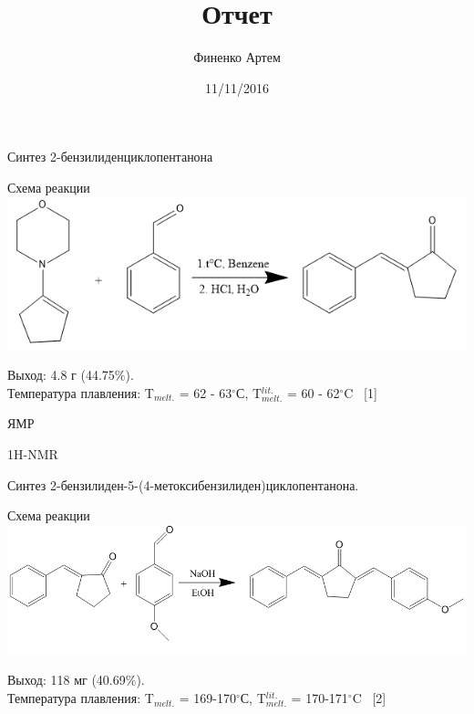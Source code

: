\documentclass{beamer}
\title{Отчет}
\author{Финенко Артем}
\institute[MSU] %
{
  МГУ им. М.В.Ломоносова \\
  Химический факультет
}
\date{11/11/2016}
\begin{document}
\begin{frame}
  \titlepage
\end{frame}

\begin{frame}{Синтез 2-бензилиденциклопентанона}
\begin{block}{Схема реакции}
\includegraphics[scale=0.5]{../pictures/1.png}
\end{block}
\begin{block}{}
Выход: 4.8 г (44.75$\%$). \\
Температура плавления: T$_{melt.}$ = 62 - 63$^{\circ}$С, T$_{melt.}^{lit.}$ = 60 - 62$^{\circ}$C \ [1] \\
\end{block}
\end{frame}

\begin{frame}{ЯМР}
\begin{block}{1H-NMR}
\begin{center}
\end{center}
\end{block}
\end{frame}

\begin{frame}{Синтез 2-бензилиден-5-(4-метоксибензилиден)циклопентанона.}
\begin{block}{Схема реакции}
\includegraphics[scale=0.31]{../pictures/2.png}
\end{block}
\begin{block}{}
Выход: 118 мг (40.69$\%$). \\
Температура плавления: T$_{melt.}$ = 169-170$^{\circ}$С, T$_{melt.}^{lit.}$ = 170-171$^{\circ}$C \ [2] \\
\end{block}
\end{frame}
\end{document}
